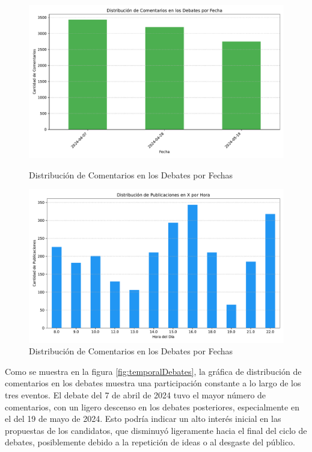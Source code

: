 \documentclass[10pt, a4paper]{article}
\begin{document}
	\begin{figure}[h!]
		\centering
		\begin{minipage}{0.49\textwidth} %
			\includegraphics[width=\linewidth]{comentarios_fecha.pdf} 
			\vspace{-3mm}
			\caption{Distribución de Comentarios en los Debates por Fechas}
			\label{fig:temporalDebates}
		\end{minipage}
		\hfill %
		\begin{minipage}{0.49\textwidth}
			\includegraphics[width=\linewidth]{publicaciones_por_hora.pdf}
			\vspace{-3mm}
			\caption{Distribución de Comentarios en los Debates por Fechas}
			\label{fig:temporalDiaEleccion}
		\end{minipage}
	\end{figure}
	
	Como se muestra en la figura \ref{fig:temporalDebates}, la gráfica de distribución de comentarios en los debates muestra una participación constante a lo largo de los tres eventos. El debate del 7 de abril de 2024 tuvo el mayor número de comentarios, con un ligero descenso en los debates posteriores, especialmente en el del 19 de mayo de 2024. Esto podría indicar un alto interés inicial en las propuestas de los candidatos, que disminuyó ligeramente hacia el final del ciclo de debates, posiblemente debido a la repetición de ideas o al desgaste del público.
	
\end{document}
